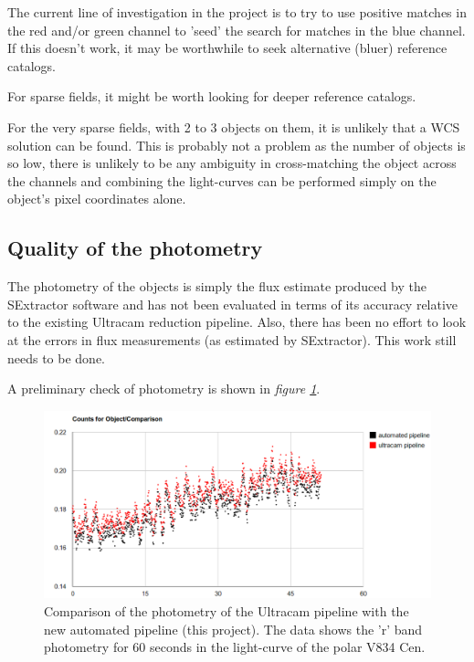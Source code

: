 \documentclass[a4paper,10pt]{article}
\begin{document}
The current line of investigation in the project is to try to use positive matches in the red and/or green channel to 'seed' the search for matches in the blue channel. If this doesn't work, it may be worthwhile to seek alternative (bluer) reference catalogs. 

For sparse fields, it might be worth looking for deeper reference catalogs. 

For the very sparse fields, with 2 to 3 objects on them, it is unlikely that a WCS solution can be found. This is probably not a problem as the number of objects is so low, there is unlikely to be any ambiguity in cross-matching the object across the channels and combining the light-curves can be performed simply on the object's pixel coordinates alone.  


\subsection{Quality of the photometry}
The photometry of the objects is simply the flux estimate produced by the SExtractor software and has not been evaluated in terms of its accuracy relative to the existing Ultracam reduction pipeline. Also, there has been no effort to look at the errors in flux measurements (as estimated by SExtractor). This work still needs to be done. 

A preliminary check of photometry is shown in \emph{figure \ref{fig:V834Cen}}. 

\begin{figure}[!h]
	\centering
	\includegraphics[width=120mm]{images/V834Cen.png}
	\caption{Comparison of the photometry of the Ultracam pipeline with the new automated pipeline (this project). The data shows the 'r' band photometry for 60 seconds in the light-curve of the polar V834 Cen.}
	\label{fig:V834Cen}
\end{figure}
\end{document}
